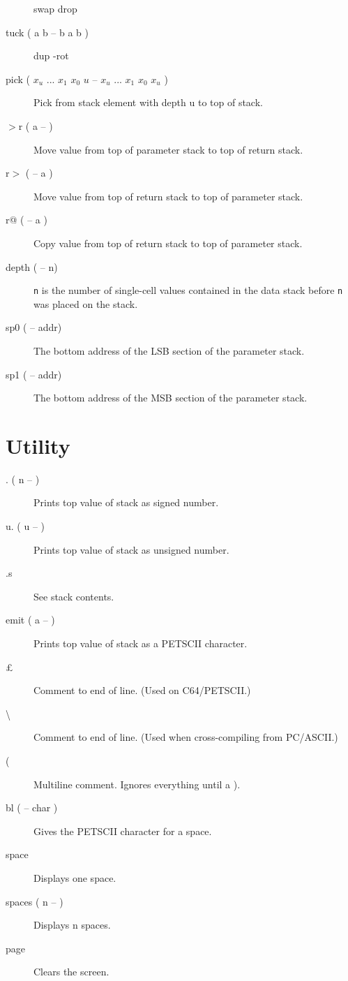 \begin{description}
swap drop

\item[tuck ( a b -- b a b )]

dup -rot

\item[pick ( $x_u$ ... $x_1$ $x_0$ $u$ -- $x_u$ ... $x_1$ $x_0$ $x_u$ )]

Pick from stack element with depth u to top of stack.

\item[$>$r ( a -- )]

Move value from top of parameter stack to top of return stack. 

\item[r$>$ ( -- a )]

Move value from top of return stack to top of parameter stack. 

\item[r@ ( -- a )]

Copy value from top of return stack to top of parameter stack. 

\item[depth ( -- n)] 

\texttt{n} is the number of single-cell values contained in the data stack before \texttt{n} was placed on the stack.

\item[sp0 ( -- addr)] 

The bottom address of the LSB section of the parameter stack.

\item[sp1 ( -- addr)] 

The bottom address of the MSB section of the parameter stack.

\end{description}

\section{Utility}

\begin{description}
\item[. ( n -- )] Prints top value of stack as signed number.
\item[u. ( u -- )] Prints top value of stack as unsigned number.
\item[.s] See stack contents.
\item[emit ( a -- )] Prints top value of stack as a PETSCII character.
\item[\pounds] Comment to end of line. (Used on C64/PETSCII.)
\item[\textbackslash] Comment to end of line. (Used when cross-compiling from PC/ASCII.)
\item[(] Multiline comment. Ignores everything until a ).
\item[bl ( -- char )] Gives the PETSCII character for a space.
\item[space] Displays one space.
\item[spaces ( n -- )] Displays n spaces.
\item[page] Clears the screen.
\end{description}

